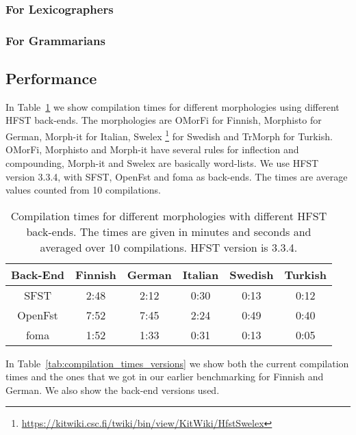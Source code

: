 \documentclass{llncs}
\begin{document}
\subsubsection{For Lexicographers}

\subsubsection{For Grammarians}

\subsection{Performance}

In Table~\ref{tab:compilation_times} we show compilation times for different 
morphologies using different HFST back-ends. The morphologies are OMorFi 
\cite{pirinen/2008} for Finnish, Morphisto \cite{zielinski/2009} for German,
Morph-it \cite{Zanchetta_2005-1} for Italian, Swelex 
\footnote{\url{https://kitwiki.csc.fi/twiki/bin/view/KitWiki/HfstSwelex}} 
for Swedish and TrMorph \cite{Coltekin/2010} for Turkish. 
OMorFi, Morphisto and Morph-it have several rules for
inflection and compounding, Morph-it and Swelex are basically word-lists.
We use HFST version 3.3.4, with SFST, OpenFst and foma as
back-ends. The times are average values counted from 10 compilations.


\begin{table} [h!]
\centering
  \caption{Compilation times for different morphologies with
    different HFST back-ends. The times are given in minutes and seconds
    and averaged over 10 compilations. HFST version is 3.3.4.}
  \begin{tabular}{| c | c | c | c | c | c |}
    \hline
    Back-End & Finnish & German & Italian & Swedish & Turkish \\ \hline\hline
    SFST & 2:48 & 2:12 & 0:30 & 0:13 & 0:12 \\ \hline
    OpenFst & 7:52 & 7:45 & 2:24 & 0:49 & 0:40 \\ \hline
    foma & 1:52 & 1:33 & 0:31 & 0:13 & 0:05 \\ \hline
    \end{tabular}
  \label{tab:compilation_times}
\end{table}


In Table~\ref{tab:compilation_times_versions} we show both the current compilation 
times and the ones that we got in our earlier benchmarking \cite{hfst/2011} for 
Finnish and German. We also show the back-end versions used.
\end{document}
